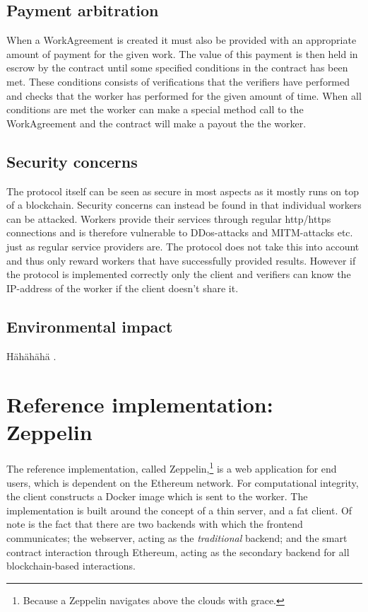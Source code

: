 \subsection{Payment arbitration}
When a WorkAgreement is created it must also be provided with an appropriate amount of payment for the given work. The value of this payment is then held in escrow by the contract until some specified conditions in the contract has been met. These conditions consists of verifications that the verifiers have performed and checks that the worker has performed for the given amount of time. When all conditions are met the worker can make a special method call to the WorkAgreement and the contract will make a payout the the worker.

\subsection{Security concerns}
The protocol itself can be seen as secure in most aspects as it mostly runs on top of a blockchain. Security concerns can instead be found in that individual workers can be attacked. Workers provide their services through regular http/https connections and is therefore vulnerable to DDos-attacks and MITM-attacks etc. just as regular service providers are. The protocol does not take this into account and thus only reward workers that have successfully provided results. However if the protocol is implemented correctly only the client and verifiers can know the IP-address of the worker if the client doesn't share it.

\subsection{Environmental impact}
Hähähähä \cite{cook}.

\section{Reference implementation: Zeppelin}
The reference implementation, called Zeppelin,\footnote{Because a Zeppelin navigates above the clouds with grace.} is a web application for end users, which is dependent on the Ethereum network. For computational integrity, the client constructs a Docker image which is sent to the worker. The implementation is built around the concept of a thin server, and a fat client. Of note is the fact that there are two backends with which the frontend communicates; the webserver, acting as the \textit{traditional} backend; and the smart contract interaction through Ethereum, acting as the secondary backend for all blockchain-based interactions.

